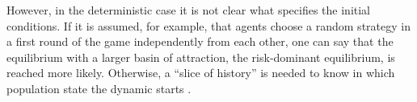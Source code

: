 However, in the deterministic case it is not clear what specifies the 
initial conditions. 
If it is assumed, for example, that agents choose a random strategy 
in a first round of the game independently from each other, 
one can say that the equilibrium with a 
larger basin of attraction, the risk-dominant equilibrium, is reached more 
likely. Otherwise, a ``slice of history'' is needed to know in which population
state the dynamic starts \parencite{friedman_economic_1998}. 
